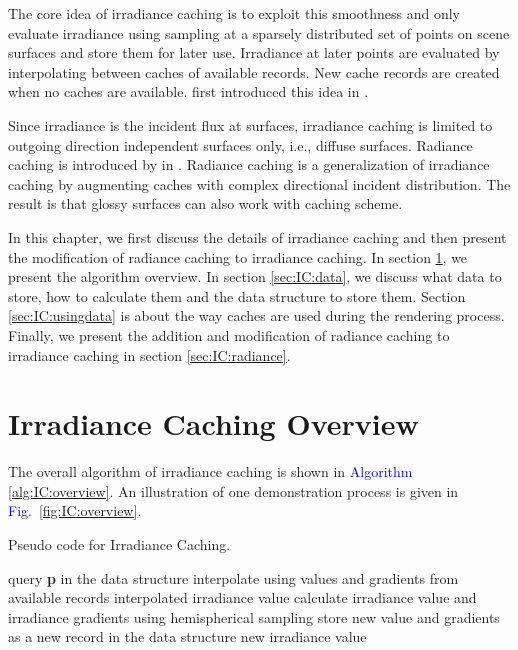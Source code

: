 \documentclass[]{book}
\renewcommand{\figurename}{\textcolor{blue}{Fig.\ }}
\begin{document}
The core idea of irradiance caching is to exploit this smoothness and only evaluate irradiance using sampling at a sparsely distributed set of points on scene surfaces and store them for later use.
Irradiance at later points are evaluated by interpolating between caches of available records.
New cache records are created when no caches are available.
\citeauthor{ward1988IC} first introduced this idea in \citeyear{ward1988IC} \cite{ward1988IC}.

Since irradiance is the incident flux at surfaces, irradiance caching is limited to outgoing direction independent surfaces only, i.e., diffuse surfaces.
Radiance caching is introduced by \citeauthor{krivanek2005radiance} in \citeyear{krivanek2005radiance} \cite{krivanek2005radiance}.
Radiance caching is a generalization of irradiance caching by augmenting caches with complex directional incident distribution.
The result is that glossy surfaces can also work with caching scheme.

In this chapter, we first discuss the details of irradiance caching and then present the modification of radiance caching to irradiance caching.
In section \ref{sec:IC:icoverview}, we present the algorithm overview.
In section \ref{sec:IC:data}, we discuss what data to store, how to calculate them and the data structure to store them.
Section \ref{sec:IC:usingdata} is about the way caches are used during the rendering process.
Finally, we present the addition and modification of radiance caching to irradiance caching in section \ref{sec:IC:radiance}.

\section{Irradiance Caching Overview}
\label{sec:IC:icoverview}
The overall algorithm of irradiance caching is shown in \textcolor{blue}{Algorithm \ref{alg:IC:overview}}.
An illustration of one demonstration process is given in \figurename \ref{fig:IC:overview}.

\begin{algorithm}[t]
\caption[Irradiance Caching]{Pseudo code for Irradiance Caching.}
\label{alg:IC:overview}
\begin{algorithmic}[1]
	\State query \textbf{p} in the data structure
		\State interpolate using values and gradients from available records
		\State \Return interpolated irradiance value
	\Else
		\State calculate irradiance value and irradiance gradients using hemispherical sampling
		\State store new value and gradients as a new record in the data structure
		\State \Return new irradiance value
	\EndIf
\EndProcedure
\end{algorithmic}
\end{algorithm}
\end{document}
